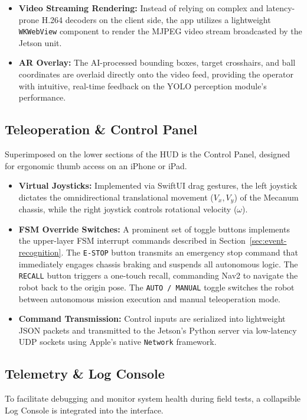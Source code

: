 \begin{itemize}
  \item \textbf{Video Streaming Rendering:} Instead of relying on complex and latency-prone H.264 decoders on the client side, the app utilizes a lightweight \texttt{WKWebView} component to render the MJPEG video stream broadcasted by the Jetson unit. 

  \item \textbf{AR Overlay:} The AI-processed bounding boxes, target crosshairs, and ball coordinates are overlaid directly onto the video feed, providing the operator with intuitive, real-time feedback on the YOLO perception module's performance.
\end{itemize}


\subsection{Teleoperation \& Control Panel}
\label{sec:window}
Superimposed on the lower sections of the HUD is the Control Panel, designed for ergonomic thumb access on an iPhone or iPad.

\begin{itemize}
  \item \textbf{Virtual Joysticks:} Implemented via SwiftUI drag gestures, the left joystick dictates the omnidirectional translational movement ($V_x, V_y$) of the Mecanum chassis, while the right joystick controls rotational velocity ($\omega$). 

  \item \textbf{FSM Override Switches:} A prominent set of toggle buttons implements the upper-layer FSM interrupt commands described in Section~\ref{sec:event-recognition}. The \texttt{E-STOP} button transmits an emergency stop command that immediately engages chassis braking and suspends all autonomous logic. The \texttt{RECALL} button triggers a one-touch recall, commanding Nav2 to navigate the robot back to the origin pose. The \texttt{AUTO / MANUAL} toggle switches the robot between autonomous mission execution and manual teleoperation mode.

  \item \textbf{Command Transmission:} Control inputs are serialized into lightweight JSON packets and transmitted to the Jetson's Python server via low-latency UDP sockets using Apple's native \texttt{Network} framework.
\end{itemize}


\subsection{Telemetry \& Log Console}
\label{sec:log-window}
To facilitate debugging and monitor system health during field tests, a collapsible Log Console is integrated into the interface.

